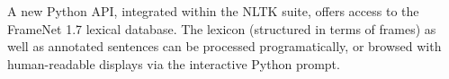A new Python API, integrated within the NLTK suite, offers access to the FrameNet 1.7 lexical database. The lexicon (structured in terms of frames) as well as annotated sentences can be processed programatically, or browsed with human-readable displays via the interactive Python prompt.
